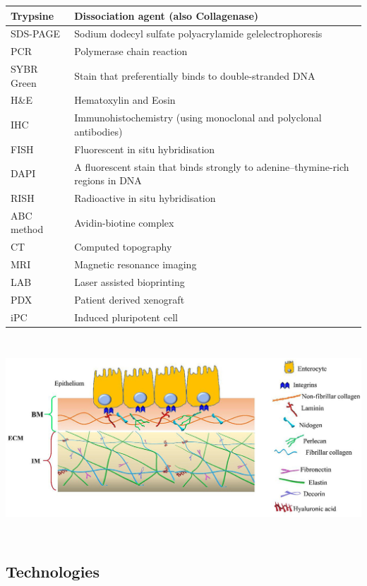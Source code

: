 \documentclass{article}
\begin{document}
\begin{table}[H]
\begin{tabular}{|l|l|}
Trypsine & Dissociation agent (also Collagenase) \\ \hline
SDS-PAGE & Sodium dodecyl sulfate polyacrylamide gelelectrophoresis \\ \hline
PCR & Polymerase chain reaction \\ \hline
SYBR Green & Stain that preferentially binds to double-stranded DNA \\ \hline     
H\&E & Hematoxylin and Eosin \\ \hline 
IHC &  Immunohistochemistry (using monoclonal and polyclonal antibodies)\\ \hline 
FISH &  Fluorescent in situ hybridisation \\ \hline 
DAPI &  A fluorescent stain that binds strongly to adenine–thymine-rich regions in DNA\\ \hline 
RISH &  Radioactive in situ hybridisation \\ \hline 
ABC method &  Avidin-biotine complex \\ \hline 
CT & Computed topography \\ \hline 
MRI & Magnetic resonance imaging \\ \hline
LAB & Laser assisted bioprinting \\ \hline
PDX & Patient derived xenograft \\ \hline
iPC & Induced pluripotent cell \\ \hline

\end{tabular}
\end{table}

\includegraphics[width=15cm, height=7.5cm]{fmed-08-610189-g001}

\subsection{Technologies}
\end{document}
